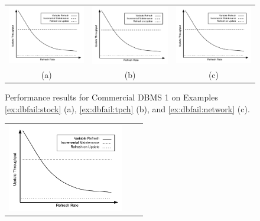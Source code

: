 \begin{figure}
\begin{center}
\begin{tabular}{ccc}
\includegraphics[width=2in]{../graphics-tmp/placeholder_db_result} &
\includegraphics[width=2in]{../graphics-tmp/placeholder_db_result} &
\includegraphics[width=2in]{../graphics-tmp/placeholder_db_result} \\
(a) & (b) & (c)
\end{tabular}
\end{center}
\label{fig:dbfail:CD1}
\caption{Performance results for Commercial DBMS 1 on Examples \ref{ex:dbfail:stock} (a), \ref{ex:dbfail:tpch} (b), and \ref{ex:dbfail:network} (c).}
\end{figure}\begin{figure}
\begin{center}
\begin{tabular}{ccc}
\includegraphics[width=2in]{../graphics-tmp/placeholder_db_result} &

\end{tabular}
\end{center}
\end{figure}
